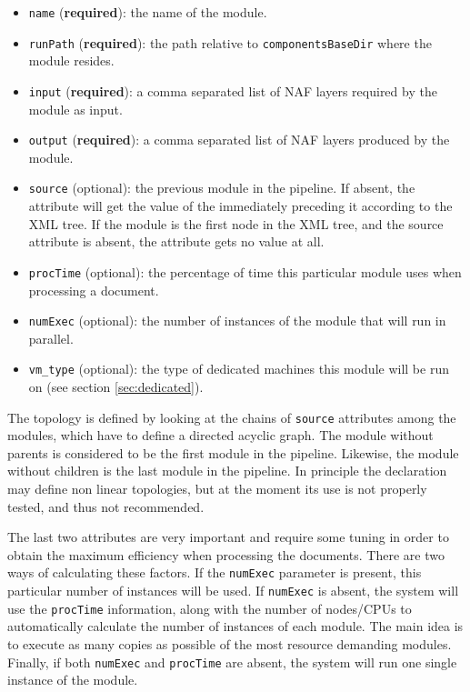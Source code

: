 \documentclass[a4]{article}
\begin{document}
\begin{itemize}
\item \texttt{name} (\textbf{required}): the name of the module.
\item \texttt{runPath} (\textbf{required}): the path relative to \texttt{componentsBaseDir}
  where the module resides.
\item \texttt{input} (\textbf{required}): a comma separated list of NAF layers required by the
  module as input.
\item \texttt{output} (\textbf{required}): a comma separated list of NAF layers produced by the
  module.
\item \texttt{source} (optional): the previous module in the pipeline. If
  absent, the attribute will get the value of the immediately preceding it
  according to the XML tree. If the module is the first node in the XML
  tree, and the source attribute is absent, the attribute gets no value at
  all.
\item \texttt{procTime} (optional): the percentage of time this particular
  module uses when processing a document.
\item \texttt{numExec} (optional): the number of instances of the module
  that will run in parallel.
\item \texttt{vm\_type} (optional): the type of dedicated machines this
  module will be run on (see section \ref{sec:dedicated}).
\end{itemize}

The topology is defined by looking at the chains of \texttt{source}
attributes among the modules, which have to define a directed acyclic
graph. The module without parents is considered to be the first module in
the pipeline. Likewise, the module without children is the last module in
the pipeline. In principle the declaration may define non linear topologies,
but at the moment its use is not properly tested, and thus not recommended.

The last two attributes are very important and require some tuning in order
to obtain the maximum efficiency when processing the documents. There are
two ways of calculating these factors. If the \texttt{numExec} parameter is
present, this particular number of instances will be used. If
\texttt{numExec} is absent, the system will use the \texttt{procTime}
information, along with the number of nodes/CPUs to automatically calculate
the number of instances of each module. The main idea is to execute as many
copies as possible of the most resource demanding modules. Finally, if both
\texttt{numExec} and \texttt{procTime} are absent, the system will run one
single instance of the module.
\end{document}
